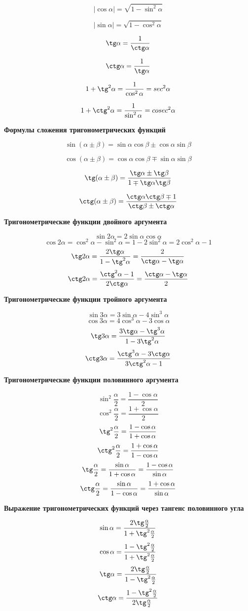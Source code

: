 \documentclass[a5paper, 8pt]{extarticle}
\begin{document}
$$|\cos \alpha |=\sqrt{1-\sin^2\alpha}$$

$$|\sin \alpha |=\sqrt{1-\cos^2\alpha}$$

$$\tg\alpha = \frac{1}{\ctg\alpha}$$

$$\ctg\alpha = \frac{1}{\tg\alpha}$$

$$1+\tg^2\alpha =\frac{1}{\cos^2\alpha}=sec^2\alpha$$

$$1+\ctg^2\alpha =\frac{1}{\sin^2\alpha}=cosec^2\alpha$$

\textbf{Формулы сложения тригонометрических функций}

$$\sin(\alpha \pm \beta )=\sin \alpha \cos \beta \pm \cos \alpha \sin \beta $$

$$\cos(\alpha \pm \beta )=\cos \alpha \cos\beta \mp \sin\alpha\sin\beta$$

$$\tg(\alpha\pm\beta)=\frac{\tg\alpha\pm\tg\beta}{1\mp\tg\alpha\tg\beta}$$

$$\ctg(\alpha\pm\beta)=\frac{\ctg\alpha\ctg\beta\mp1}{\ctg\beta\pm\ctg\alpha}$$

\textbf{Тригонометрические функции двойного аргумента}

$$\sin2\alpha=2\sin\alpha\cos\alpha$$
$$\cos2\alpha=\cos^2\alpha-\sin^2\alpha=1-2\sin^2\alpha=2\cos^2\alpha-1$$
$$\tg2\alpha=\frac{2\tg\alpha}{1-\tg^2\alpha}=\frac{2}{\ctg\alpha-\tg\alpha}$$
$$\ctg 2\alpha=\frac{\ctg^2\alpha-1}{2\ctg\alpha}=\frac{\ctg\alpha-\tg\alpha}{2}$$

\textbf{Тригонометрические функции тройного аргумента}

$$\sin3\alpha=3\sin\alpha-4\sin^3\alpha$$
$$\cos3\alpha=4\cos^3\alpha - 3\cos\alpha$$
$$\tg3\alpha=\frac{3\tg\alpha-\tg^3\alpha}{1-3\tg^2\alpha}$$
$$\ctg3\alpha=\frac{\ctg^3\alpha-3\ctg\alpha}{3\ctg^2\alpha-1}$$

\textbf{Тригонометрические функции половинного аргумента}

$$\sin^2\frac{\alpha}{2}=\frac{1-\cos\alpha}{2}$$
$$\cos^2\frac{\alpha}{2}=\frac{1+\cos\alpha}{2}$$
$$\tg^2\frac{\alpha}{2}=\frac{1-\cos\alpha}{1+\cos\alpha}$$
$$\ctg^2\frac{\alpha}{2}=\frac{1+\cos\alpha}{1-\cos\alpha}$$
$$\tg\frac{\alpha}{2}=\frac{\sin\alpha}{1+\cos\alpha}=\frac{1-\cos\alpha}{\sin\alpha}$$
$$\ctg\frac{\alpha}{2}=\frac{\sin\alpha}{1-\cos\alpha}=\frac{1+\cos\alpha}{\sin\alpha}$$

\textbf{Выражение тригонометрических функций через тангенс половинного угла}

$$\sin\alpha=\frac{2\tg\frac{\alpha}{2}}{1+\tg^2\frac{\alpha}{2}}$$
$$\cos\alpha=\frac{1-\tg^2\frac{\alpha}{2}}{1+\tg^2\frac{\alpha}{2}}$$
$$\tg\alpha=\frac{2\tg\frac{\alpha}{2}}{1-\tg^2\frac{\alpha}{2}}$$
$$\ctg\alpha=\frac{1-\tg^2\frac{\alpha}{2}}{2\tg\frac{\alpha}{2}}$$
\end{document}
